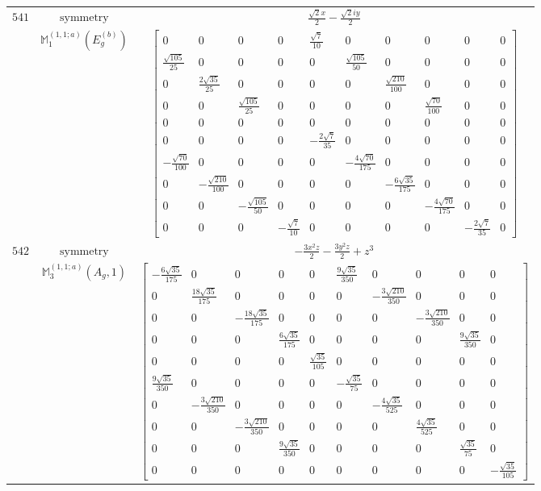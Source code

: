 \documentclass[fleqn,8pt,landscape]{jsarticle}
\begin{document}
\begin{longtable}{ccc}
$ 541 $ & $ \text{symmetry} $ & $ \frac{\sqrt{2} x}{2} - \frac{\sqrt{2} i y}{2} $ \\
$  $ & $ \mathbb{M}_{1}^{(1,1;a)}(E_{g}^{(b)}) $ & $ \begin{bmatrix} 0 & 0 & 0 & 0 & \frac{\sqrt{7}}{10} & 0 & 0 & 0 & 0 & 0 \\ \frac{\sqrt{105}}{25} & 0 & 0 & 0 & 0 & \frac{\sqrt{105}}{50} & 0 & 0 & 0 & 0 \\ 0 & \frac{2 \sqrt{35}}{25} & 0 & 0 & 0 & 0 & \frac{\sqrt{210}}{100} & 0 & 0 & 0 \\ 0 & 0 & \frac{\sqrt{105}}{25} & 0 & 0 & 0 & 0 & \frac{\sqrt{70}}{100} & 0 & 0 \\ 0 & 0 & 0 & 0 & 0 & 0 & 0 & 0 & 0 & 0 \\ 0 & 0 & 0 & 0 & - \frac{2 \sqrt{7}}{35} & 0 & 0 & 0 & 0 & 0 \\ - \frac{\sqrt{70}}{100} & 0 & 0 & 0 & 0 & - \frac{4 \sqrt{70}}{175} & 0 & 0 & 0 & 0 \\ 0 & - \frac{\sqrt{210}}{100} & 0 & 0 & 0 & 0 & - \frac{6 \sqrt{35}}{175} & 0 & 0 & 0 \\ 0 & 0 & - \frac{\sqrt{105}}{50} & 0 & 0 & 0 & 0 & - \frac{4 \sqrt{70}}{175} & 0 & 0 \\ 0 & 0 & 0 & - \frac{\sqrt{7}}{10} & 0 & 0 & 0 & 0 & - \frac{2 \sqrt{7}}{35} & 0 \end{bmatrix} $ \\ \hline
$ 542 $ & $ \text{symmetry} $ & $ - \frac{3 x^{2} z}{2} - \frac{3 y^{2} z}{2} + z^{3} $ \\
$  $ & $ \mathbb{M}_{3}^{(1,1;a)}(A_{g},1) $ & $ \begin{bmatrix} - \frac{6 \sqrt{35}}{175} & 0 & 0 & 0 & 0 & \frac{9 \sqrt{35}}{350} & 0 & 0 & 0 & 0 \\ 0 & \frac{18 \sqrt{35}}{175} & 0 & 0 & 0 & 0 & - \frac{3 \sqrt{210}}{350} & 0 & 0 & 0 \\ 0 & 0 & - \frac{18 \sqrt{35}}{175} & 0 & 0 & 0 & 0 & - \frac{3 \sqrt{210}}{350} & 0 & 0 \\ 0 & 0 & 0 & \frac{6 \sqrt{35}}{175} & 0 & 0 & 0 & 0 & \frac{9 \sqrt{35}}{350} & 0 \\ 0 & 0 & 0 & 0 & \frac{\sqrt{35}}{105} & 0 & 0 & 0 & 0 & 0 \\ \frac{9 \sqrt{35}}{350} & 0 & 0 & 0 & 0 & - \frac{\sqrt{35}}{75} & 0 & 0 & 0 & 0 \\ 0 & - \frac{3 \sqrt{210}}{350} & 0 & 0 & 0 & 0 & - \frac{4 \sqrt{35}}{525} & 0 & 0 & 0 \\ 0 & 0 & - \frac{3 \sqrt{210}}{350} & 0 & 0 & 0 & 0 & \frac{4 \sqrt{35}}{525} & 0 & 0 \\ 0 & 0 & 0 & \frac{9 \sqrt{35}}{350} & 0 & 0 & 0 & 0 & \frac{\sqrt{35}}{75} & 0 \\ 0 & 0 & 0 & 0 & 0 & 0 & 0 & 0 & 0 & - \frac{\sqrt{35}}{105} \end{bmatrix} $ \\ \hline

\end{longtable}
\end{document}
